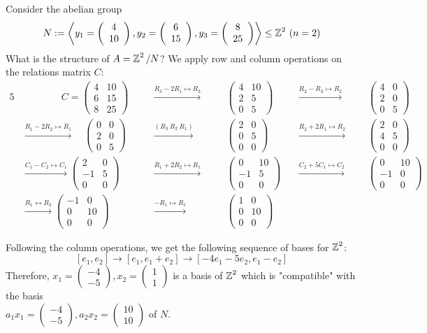 \documentclass[11pt]{book}
\theoremstyle{definition}   \newtheorem{defn}[counter]{Definition} %
\newcommand{\lra}{\leftrightarrow}   \newcommand{\0}{\mathbf{0}}   \newcommand{\mc}[1]{\mathcal{#1}}   \newcommand{\hra}{\hookrightarrow}   \newcommand{\hla}{\hookleftarrow}
\newcommand{\mymatrix}[2]{\left( \begin{array}{#1} #2 \end{array} \right)}
\newcommand{\gen}[1]{\left\langle #1 \right\rangle}   \newcommand{\stab}[2]{\tn{Stab}_{#1}(#2)}   \newcommand{\fix}[2]{\tn{Fix}_{#1}(#2)}   \newcommand{\op}{^{\tn{op}}}
\numberwithin{counter}{chapter}
\begin{document}
\begin{example}
Consider the abelian group
	\[N := \gen{y_1 = \mymatrix{c}{4 \\ 10}, y_2 = \mymatrix{c}{6 \\ 15}, y_3 = \mymatrix{c}{8 \\ 25}} \leq \z^2 \ (n = 2) \]
What is the structure of $A = \operatorname{\mathbb{Z}}^2/N$? We apply row and column operations on the relations matrix $C$:
\begin{alignat*}{5}
& \qquad \qquad C = \mymatrix{rr}{4 & 10 \\ 6 & 15 \\ 8 & 25} \quad && \overset{R_3 - 2R_1 \mapsto R_3}{\longrightarrow} \quad && \mymatrix{rr}{4 & 10 \\ 2 & 5 \\ 0 & 5} \quad && \overset{R_2 - R_3 \mapsto R_2}{\longrightarrow} \quad && \mymatrix{rr}{4 & 0 \\ 2 & 0 \\ 0 & 5} \\
& \overset{R_1 - 2R_2 \mapsto R_1}{\longrightarrow} \quad \mymatrix{rr}{0 & 0 \\ 2 & 0 \\ 0 & 5} && \overset{(R_3 \ R_2 \ R_1)}{\longrightarrow} && \mymatrix{rr}{2 & 0 \\ 0 & 5 \\ 0 & 0} && \overset{R_2 + 2 R_1 \mapsto R_2}{\longrightarrow} && \mymatrix{cc}{2 & 0 \\ 4 & 5 \\ 0 & 0} \\
& \overset{C_1 - C_2 \mapsto C_1}{\longrightarrow} \mymatrix{cc}{2 & 0 \\ -1 & 5 \\ 0 & 0} && \overset{R_1 + 2R_2 \mapsto R_1}{\longrightarrow} && \mymatrix{rr}{0 & 10 \\ -1 & 5 \\ 0 & 0} && \overset{C_2 + 5 C_1 \mapsto C_2}{\longrightarrow} && \mymatrix{rr}{0 & 10 \\ -1 & 0 \\ 0 & 0} \\
& \overset{R_1 \lra R_2}{\longrightarrow} \mymatrix{rr}{-1 & 0 \\ 0 & 10 \\ 0 & 0} && \overset{-R_1 \mapsto R_1}{\longrightarrow} && \mymatrix{rr}{1 & 0 \\ 0 & 10 \\ 0 & 0}
\end{alignat*}

Following the column operations, we get the following sequence of bases for $\operatorname{\mathbb{Z}}^2$:
	\[[e_1,e_2] \longrightarrow [e_1,e_1 + e_2] \longrightarrow [-4e_1 - 5e_2, e_1 - e_2] \]
Therefore, $x_1 = \mymatrix{r}{-4 \\ -5}, x_2 = \mymatrix{r}{1 \\ 1}$ is a basis of $\operatorname{\mathbb{Z}}^2$ which is "compatible" with the basis \\ $a_1 x_1 = \mymatrix{r}{-4 \\ -5}, a_2 x_2 = \mymatrix{r}{10 \\ 10}$ of $N$.
\end{example}
\end{document}
